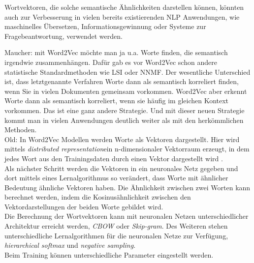 \documentclass[12pt,a4paper]{report}
\begin{document}
Wortvektoren, die solche semantische Ähnlichkeiten darstellen können, könnten auch zur Verbesserung in vielen bereits existierenden NLP Anwendungen, wie maschinelles Übersetzen, Informationsgewinnung oder Systeme zur Fragebeantwortung, verwendet werden\citep{DBLP:journals/corr/abs-1301-3781}.\\



  
\iffalse

Maucher:
mit Word2Vec möchte man ja u.a. Worte finden, die semantisch irgendwie zusammenhängen. Dafür gab es vor Word2Vec schon andere statistische Standardmethoden wie LSI oder NNMF. Der wesentliche Unterschied ist, dass letztgenannte Verfahren Worte dann als semantisch korreliert finden, wenn Sie in vielen Dokumenten gemeinsam vorkommen.
 Word2Vec aber erkennt Worte dann als semantisch korreliert, wenn sie häufig im gleichen Kontext vorkommen. 
 Das ist eine ganz andere Strategie. 
 Und mit dieser neuen Strategie kommt man in vielen Anwendungen deutlich weiter als mit den herkömmlichen Methoden.\\




Old:
In Word2Vec Modellen werden Worte als Vektoren dargestellt. Hier wird mittels \textit{distributed representation}ein n-dimensionaler Vektorraum erzeugt, in dem jedes Wort aus den Trainingsdaten durch einen Vektor dargestellt wird \cite{DBLP:journals/corr/abs-1301-3781}. \\
Als nächster Schritt werden die Vektoren in ein neuronales Netz gegeben und dort mittels eines Lernalgorithmus so verändert, dass Worte mit ähnlicher Bedeutung ähnliche Vektoren haben. Die Ähnlichkeit zwischen zwei Worten kann berechnet werden, indem die Kosinusähnlichkeit zwischen den Vektordarstellungen der beiden Worte gebildet wird.\\


Die Berechnung der Wortvektoren kann mit neuronalen Netzen unterschiedlicher Architektur erreicht werden, \textit{CBOW} oder \textit{Skip-gram}. Des Weiteren stehen unterschiedliche Lernalgorithmen für die neuronalen Netze zur Verfügung, \textit{hierarchical softmax}  und \textit{negative sampling}.\\
Beim Training können unterschiedliche Parameter eingestellt werden.\\
\end{document}

